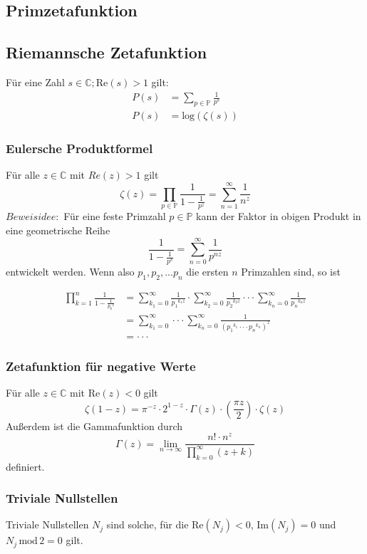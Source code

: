 \documentclass{article}
\newcommand{\PR}{\mathbb{P}}
\newcommand{\C}{\mathbb{C}}
\renewcommand{\mod}{\,\mathrm{mod}\,}
\begin{document}
\subsection{Primzetafunktion}

\subsection{Riemannsche Zetafunktion}

Für eine Zahl $s \in \C; \textrm{Re}(s) > 1$ gilt:
\begin{align*}
P(s) &= \sum\limits_{p \in \mathbb{P}} \frac{1}{p^s} \\
P(s) &= \textrm{log}(\zeta(s))
\end{align*}

\subsubsection{Eulersche Produktformel}
Für alle $z \in \C$ mit $Re(z) > 1$ gilt
\[ \zeta(z) = \prod_{p \in \PR} {\frac{1}{1 - \frac{1}{p^z}}}  = \sum_{n=1}^{\infty} \frac{1}{n^z}\]
$Beweisidee:$ Für eine feste Primzahl $p \in \PR$ kann der Faktor in obigen Produkt in eine geometrische Reihe
\[ \frac{1}{1 - \frac{1}{p^s}} = \sum_{n=0}^{\infty} {\frac{1}{p^{nz}}} \]
entwickelt werden. Wenn also $p_1, p_2, ... p_n$ die ersten $n$ Primzahlen sind, so ist

\begin{align*}
\prod_{k=1}^{n} {\frac{1}{1 - \frac{1}{{p_k}^z}}} &= \sum_{k_1=0}^{\infty} {\frac{1}{{p_1}^{k_1 z}}} \cdot \sum_{k_2=0}^{\infty} {\frac{1}{{p_2}^{k_2 z}}} \cdot\cdot\cdot \sum_{k_n=0}^{\infty} {\frac{1}{{p_n}^{k_n z}}} \\
&= \sum_{k_1=0}^{\infty} \cdot\cdot\cdot \sum_{k_n=0}^{\infty} \frac{1}{({p_1}^{k_1} \cdot\cdot\cdot {p_n}^{k_n})^z} \\
&= \cdot\cdot\cdot
\end{align*}
\subsubsection{Zetafunktion für negative Werte}

Für alle $z \in \C$ mit $\textrm{Re}(z) < 0$ gilt
\[ \zeta(1-z) = \pi^{-z} \cdot 2^{1-z} \cdot \Gamma(z) \cdot\left(\frac{\pi z}{2}\right) \cdot \zeta(z) \]
Außerdem ist die Gammafunktion durch 
\[ \Gamma(z) = \lim\limits_{n \to \infty} \frac{n! \cdot n^z}{\prod\limits_{k=0}^{\infty} (z+k)} \]
definiert.

\subsubsection{Triviale Nullstellen}
Triviale Nullstellen $N_j$ sind solche, für die $\textrm{Re}(N_j) < 0$, $\textrm{Im}(N_j) = 0$ und $N_j \mod 2 = 0$ gilt.
\end{document}
